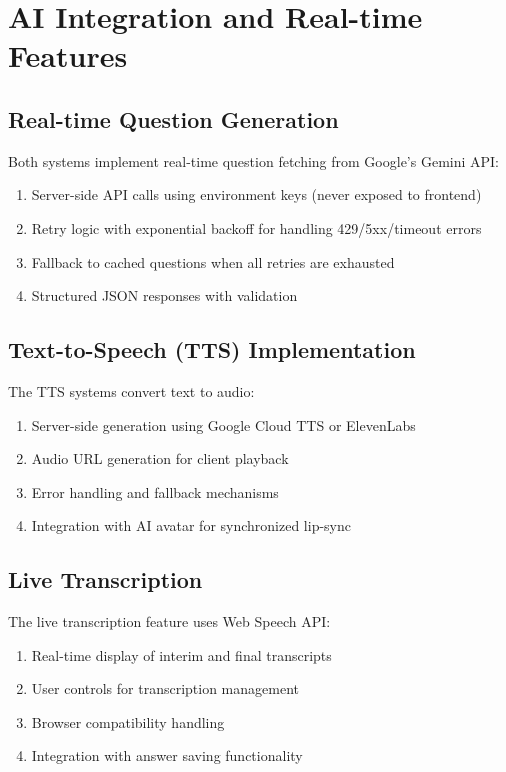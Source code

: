 \documentclass[12pt, conference]{IEEEtran}
\begin{document}
\section{AI Integration and Real-time Features}

\subsection{Real-time Question Generation}

Both systems implement real-time question fetching from Google's Gemini API:
\begin{enumerate}
    \item Server-side API calls using environment keys (never exposed to frontend)
    \item Retry logic with exponential backoff for handling 429/5xx/timeout errors
    \item Fallback to cached questions when all retries are exhausted
    \item Structured JSON responses with validation
\end{enumerate}

\subsection{Text-to-Speech (TTS) Implementation}

The TTS systems convert text to audio:
\begin{enumerate}
    \item Server-side generation using Google Cloud TTS or ElevenLabs
    \item Audio URL generation for client playback
    \item Error handling and fallback mechanisms
    \item Integration with AI avatar for synchronized lip-sync
\end{enumerate}

\subsection{Live Transcription}

The live transcription feature uses Web Speech API:
\begin{enumerate}
    \item Real-time display of interim and final transcripts
    \item User controls for transcription management
    \item Browser compatibility handling
    \item Integration with answer saving functionality
\end{enumerate}
\end{document}
